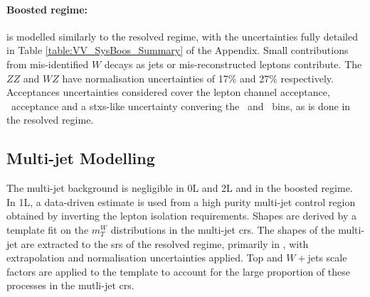 \paragraph{Boosted regime:} is modelled similarly to the resolved regime, with the uncertainties fully detailed in Table \ref{table:VV_SysBoos_Summary} of the Appendix. Small contributions from mis-identified $W$ decays as jets or mis-reconstructed leptons contribute. The $ZZ$ and $WZ$ have normalisation uncertainties of 17\% and 27\% respectively. Acceptances uncertainties considered cover the lepton channel acceptance, \ptv\ acceptance and a \gls{stxs}-like uncertainty convering the \ptv\ and \nj\ bins, as is done in the resolved regime.

\subsection{Multi-jet Modelling}\label{sec-modMultiJ} 
The multi-jet background is negligible in 0L and 2L and in the boosted regime. In 1L, a data-driven estimate is used from a high purity multi-jet control region obtained by inverting the lepton isolation requirements. Shapes are derived by a template fit on the $m_T^W$ distributions in the multi-jet \gls{cr}s. The shapes of the multi-jet are extracted to the \gls{sr}s of the resolved regime, primarily in \vhc, with extrapolation and normalisation uncertainties applied. Top and $W+$jets scale factors are applied to the template to account for the large proportion of these processes in the mutli-jet \gls{cr}s.